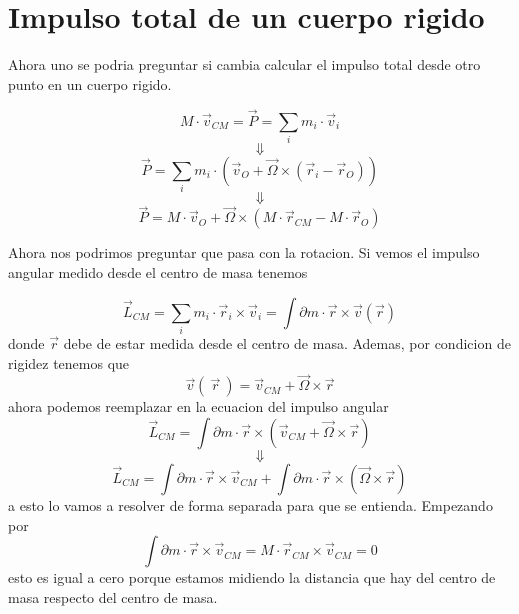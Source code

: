 \documentclass[../Main.tex]{subfiles}
\begin{document}
\npage{
}
{
    \section{Impulso total de un cuerpo rigido}

    Ahora uno se podria preguntar si cambia calcular el impulso total desde otro
    punto en un cuerpo rigido.

    \begin{equation*}
        M \cdot \vec{v}_{CM} = \vec{P} = \sum_i m_i \cdot \vec{v}_i
    \end{equation*}
    \begin{equation*}
        \Downarrow
    \end{equation*}
    \begin{equation*}
        \vec{P} = \sum_i m_i \cdot \left( \vec{v}_O + \vec{\Omega} \times \left( \vec{r}_i - \vec{r}_O \right) \right)
    \end{equation*}
    \begin{equation*}
        \Downarrow
    \end{equation*}
    \begin{equation*}
        \vec{P} = M \cdot \vec{v}_O + \vec{\Omega} \times \left( M \cdot \vec{r}_{CM} - M \cdot \vec{r}_O \right)
    \end{equation*}

    Ahora nos podrimos preguntar que pasa con la rotacion. Si vemos el impulso
    angular medido desde el centro de masa tenemos

    \begin{equation*}
        \vec{L}_{CM} = \sum_i m_i \cdot \vec{r}_i \times \vec{v}_i = \int \partial m \cdot \vec{r} \times \vec{v} \left( \vec{r} \right)
    \end{equation*}
    donde $\vec{r}$ debe de estar medida desde el centro de masa. Ademas, por
    condicion de rigidez tenemos que
    \begin{equation*}
        \vec{v} \left( \ \vec{r} \ \right) = \vec{v}_{CM} + \vec{\Omega} \times \vec{r}
    \end{equation*}
    ahora podemos reemplazar en la ecuacion del impulso angular
    \begin{equation*}
        \vec{L}_{CM} = \int \partial m \cdot \vec{r} \times \left( \vec{v}_{CM} + \vec{\Omega} \times \vec{r} \right)
    \end{equation*}
    \begin{equation*}
        \Downarrow
    \end{equation*}
    \begin{equation*}
        \vec{L}_{CM} = \int \partial m \cdot \vec{r} \times \vec{v}_{CM} + \int \partial m \cdot \vec{r} \times \left( \vec{\Omega} \times \vec{r} \right)
    \end{equation*}
    a esto lo vamos a resolver de forma separada para que se entienda. Empezando por
    \begin{equation*}
        \int \partial m \cdot \vec{r} \times \vec{v}_{CM} = M \cdot \vec{r}_{CM} \times \vec{v}_{CM} = 0
    \end{equation*}
    esto es igual a cero porque estamos midiendo la distancia que hay del centro
    de masa respecto del centro de masa.
}
\end{document}
